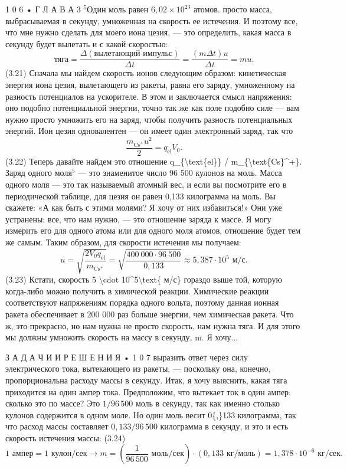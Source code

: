 \documentclass[10pt,oneside]{article}
\begin{document}
1 0 6 • Г Л А В А  3 \(^5\)Один моль равен \(6{,}02 \times 10^{23}\) атомов. просто масса, выбрасываемая в секунду, умноженная на скорость ее истечения. И поэтому все, что мне нужно сделать для моего иона цезия, --- это определить, какая масса в секунду будет вылетать и с какой скоростью: \[\text{тяга} = \frac{\Delta(\text{вылетающий импульс})}{\Delta t} = \frac{(m\Delta t) u}{\Delta t} = mu.\] (3.21) Сначала мы найдем скорость ионов следующим образом: кинетическая энергия иона цезия, вылетающего из ракеты, равна его заряду, умноженному на разность потенциалов на ускорителе. В этом и заключается смысл напряжения: оно подобно потенциальной энергии, точно так же как поле подобно силе --- вам нужно просто умножить его на заряд, чтобы получить разность потенциальных энергий. Ион цезия одновалентен --- он имеет один электронный заряд, так что \[\frac{m_{\text{Cs}^+} u^2}{2} = q_{\text{el}} V_0.\] (3.22) Теперь давайте найдем это отношение q\_\{\textbackslash{}text\{el\}\} / m\_\{\textbackslash{}text\{Cs\}\textasciicircum{}+\}. Заряд одного моля\(^5\) --- это знаменитое число 96 500 кулонов на моль. Масса одного моля --- это так называемый атомный вес, и если вы посмотрите его в периодической таблице, для цезия он равен 0,133 килограмма на моль. Вы скажете: «А как быть с этими молями? Я хочу от них избавиться!» Они уже устранены: все, что нам нужно, --- это отношение заряда к массе. Я могу измерить его для одного атома или для одного моля атомов, отношение будет тем же самым. Таким образом, для скорости истечения мы получаем: \[u = \sqrt{\frac{2 V_0 q_{\text{el}}}{m_{\text{Cs}^+}}} = \sqrt{\frac{400\ 000 \cdot 96\ 500}{0{,}133}} \approx 5{,}387 \cdot 10^5\text{ м/с}.\] (3.23) Кстати, скорость 5 \textbackslash{}cdot 10\textasciicircum{}5\textbackslash{}text\{ м/с\} гораздо выше той, которую когда-либо можно получить в химической реакции. Химические реакции соответствуют напряжениям порядка одного вольта, поэтому данная ионная ракета обеспечивает в 200 000 раз больше энергии, чем химическая ракета. Что ж, это прекрасно, но нам нужна не просто скорость, нам нужна тяга. И для этого мы должны умножить скорость на массу в секунду, m. Я хочу...\par

З А Д А Ч И  И  Р Е Ш Е Н И Я • 1 0 7 выразить ответ через силу электрического тока, вытекающего из ракеты, --- поскольку она, конечно, пропорциональна расходу массы в секунду. Итак, я хочу выяснить, какая тяга приходится на один ампер тока. Предположим, что вытекает ток в один ампер: сколько это по массе? Это \(1/96\,500\) моль в секунду, так как именно столько кулонов содержится в одном моле. Но один моль весит 0\{,\}133 килограмма, так что расход массы составляет \(0{,}133/96\,500\) килограмма в секунду, и это и есть скорость истечения массы: (3.24) \[1\text{ ампер} = 1\text{ кулон/сек} \rightarrow m = \left(\frac{1}{96\,500}\text{ моль/сек}\right) \cdot (0{,}133\text{ кг/моль}) = 1{,}378 \cdot 10^{-6}\text{ кг/сек}.\]\par
\end{document}
